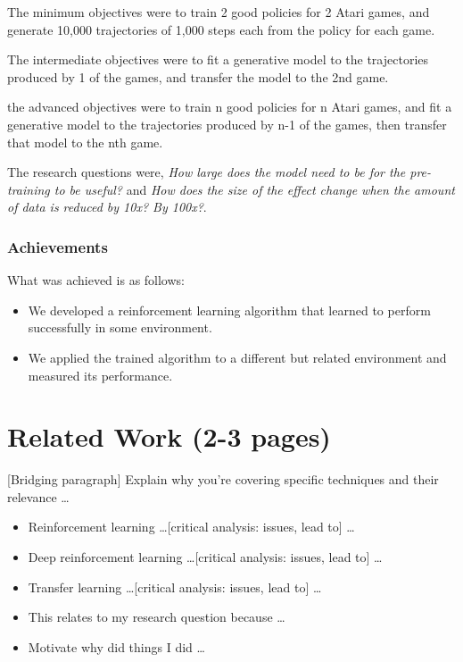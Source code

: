 \documentclass[12pt,a4paper]{article}
\begin{document}
The minimum objectives were to train 2 good policies for 2 Atari games, and generate 10,000 trajectories of 1,000 steps each from the policy for each game.

The intermediate objectives were to fit a generative model to the trajectories produced by 1 of the games, and transfer the model to the 2nd game.

the advanced objectives were to train n good policies for n Atari games, and fit a generative model to the trajectories produced by n-1 of the games, then transfer that model to the nth game.

The research questions were, \textit{How large does the model need to be for the pre-training to be useful?} and \textit{How does the size of the effect change when the amount of data is reduced by 10x? By 100x?}.

\subsubsection{Achievements}
What was achieved is as follows:
\begin{itemize}
    \item We developed a reinforcement learning algorithm that learned to perform successfully in some environment.
    \item We applied the trained algorithm to a different but related environment and measured its performance.
\end{itemize}

\section{Related Work (2-3 pages)}
\label{section:related-work}
[Bridging paragraph] Explain why you're covering specific techniques and their relevance \dots

\begin{itemize}
    \item Reinforcement learning \dots [critical analysis: issues, lead to] \dots
    \item Deep reinforcement learning \dots [critical analysis: issues, lead to] \dots
    \item Transfer learning \dots [critical analysis: issues, lead to] \dots
\end{itemize}

\begin{itemize}
    \item This relates to my research question because \dots 
    \item Motivate why did things I did \dots
\end{itemize}
 
\end{document}
